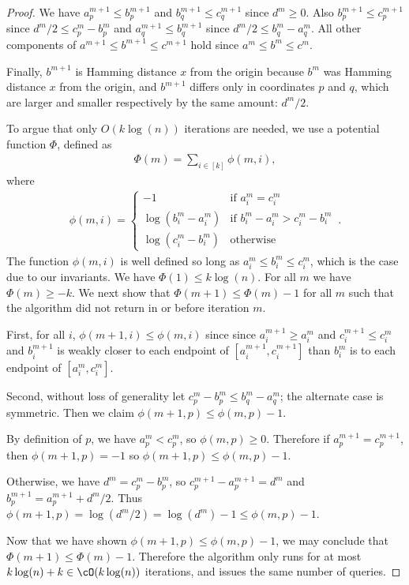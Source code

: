 \documentclass[11pt]{article}
\begin{document}
\begin{proof}
    We have $a^{m+1}_p \le b^{m+1}_p$ and $b^{m+1}_q \le c^{m+1}_q$ since $d^m \ge 0$.
    Also $b^{m+1}_p \le c^{m+1}_p$ since $d^m/2 \le c^m_p - b^m_p$ and $a^{m+1}_q \le b^{m+1}_q$ since $d^m/2 \le b^m_q - a^m_q$.
    All other components of $a^{m+1} \le b^{m+1} \le c^{m+1}$ hold since $a^m \le b^m \le c^m$.

    Finally, $b^{m+1}$ is Hamming distance $x$ from the origin because $b^m$ was Hamming distance $x$ from the origin, and $b^{m+1}$ differs only in coordinates $p$ and $q$, which are larger and smaller respectively by the same amount: $d^m/2$.

    To argue that only $O(k \log(n))$ iterations are needed, we use a potential function $\Phi$, defined as
    \begin{align}
        \Phi(m) = \sum_{i \in [k]} \phi(m,i), 
    \end{align}
    where
    \begin{align}
        \phi(m,i) = \begin{cases}
            -1 & \text{if } a^m_i = c^m_i\\
            \log(b^m_i - a^m_i) & \text{if } b^m_i - a^m_i > c^m_i - b^m_i\\
            \log(c^m_i - b^m_i) & \text{otherwise}
        \end{cases}\,.
    \end{align}
    The function $\phi(m,i)$ is well defined so long as $a^m_i \le b^m_i \le c^m_i$, which is the case due to our invariants.
    We have $\Phi(1) \le k \log(n)$.
    For all $m$ we have $\Phi(m) \ge -k$.
    We next show that $\Phi(m+1)\le \Phi(m)-1$ for all $m$ such that the algorithm did not return in or before iteration $m$.
    
    First, for all $i$, $\phi(m+1,i) \le \phi(m,i)$ since since $a^{m+1}_i \ge a^m_i$ and $c^{m+1}_i \le c^m_i$ and $b^{m+1}_i$ is weakly closer to each endpoint of $[a^{m+1}_i, c^{m+1}_i]$ than $b^m_i$ is to each endpoint of $[a^m_i, c^m_i]$.

    Second, without loss of generality let $c^m_p - b^m_p \le b^m_q - a^m_q$; the alternate case is symmetric.
    Then we claim $\phi(m+1,p) \le \phi(m,p) - 1$.

    By definition of $p$, we have $a^m_p < c^m_p$, so $\phi(m,p) \ge 0$.
    Therefore if $a^{m+1}_p = c^{m+1}_p$, then $\phi(m+1,p) = -1$ so $\phi(m+1,p) \le \phi(m,p) - 1$.
    
    Otherwise, we have $d^m = c^m_p - b^m_p$, so $c^{m+1}_p - a^{m+1}_p = d^m$ and $b^{m+1}_p = a^{m+1}_p + d^m/2$.
    Thus $\phi(m+1,p) = \log(d^m/2) = \log(d^m) - 1 \le \phi(m,p) - 1$.

    Now that we have shown $\phi(m+1,p) \le \phi(m,p) - 1$, we may conclude that $\Phi(m+1) \le \Phi(m) - 1$. Therefore the algorithm only runs for at most $k \log(n) + k \in \cO(k \log(n))$ iterations, and issues the same number of queries.
\end{proof}
\end{document}
